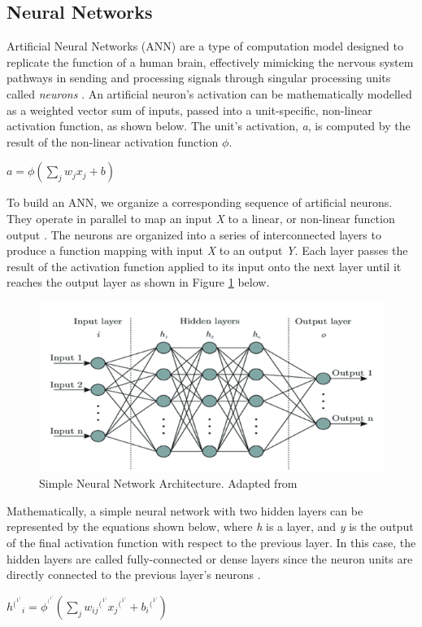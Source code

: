 \documentclass{article}
\begin{document}
\subsection{Neural Networks}
Artificial Neural Networks (ANN) are a type of computation model designed to replicate the function of a human brain, effectively mimicking the nervous system pathways in sending and processing signals through singular processing units called \emph{neurons} \cite{gurney1997introduction}. An artificial neuron’s activation can be mathematically modelled as a weighted vector sum of inputs, passed into a unit-specific, non-linear activation function, as shown below. The unit’s activation, \emph{a}, is computed by the result of the non-linear activation function $\phi$.
\newline
\newline
\centerline{$a = \phi(\sum_{j} w_{j}x_{j} + b)$ \cite{grosse2019lecture03}}
\newline

To build an ANN, we organize a corresponding sequence of artificial neurons. They operate in parallel to map an input \emph{X} to a linear, or non-linear function output \cite{https://doi.org/10.1002/cpe.6767,seger2018investigation}. The neurons are organized into a series of interconnected layers to produce a function mapping with input \emph{X} to an output \emph{Y}. Each layer passes the result of the activation function applied to its input onto the next layer until it reaches the output layer as shown in Figure \ref{fig:my_label} below.

\begin{figure}[h!]
    \centering
    \includegraphics[scale=0.75]{NN_figure.png}
    \caption{Simple Neural Network Architecture. Adapted from \cite{https://doi.org/10.1002/cpe.6767}}
    \label{fig:my_label}
\end{figure}


Mathematically, a simple neural network with two hidden layers can be represented by the equations shown below, where \emph{h} is a layer, and \emph{y} is the output of the final activation function with respect to the previous layer. In this case, the hidden layers are called fully-connected or dense layers since the neuron units are directly connected to the previous layer’s neurons \cite{grosse2019lecture03}.
\newline
\newline
\centerline{$h{^(^1^)}_{i} = \phi^{^(^1^)}(\sum_{j} w_{ij}{^(^1^)}x_j{^(^1^)} + b_i{^(^1^)})$}
\end{document}
